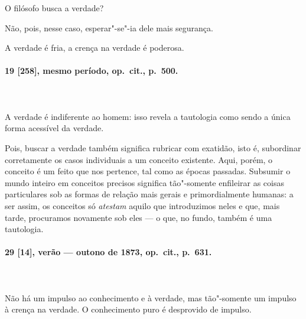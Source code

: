 O filósofo busca a verdade?

Não, pois, nesse caso, esperar"-se"-ia dele mais segurança.

A verdade é fria, a crença na verdade é poderosa.

\pagebreak
\paragraph*{19 [258], mesmo período, op.~cit., p.~500.}
\ \\
\ \\

A verdade é indiferente ao homem: isso revela a tautologia como sendo a
única forma acessível da verdade.

Pois, buscar a verdade também significa rubricar com exatidão, isto é,
subordinar corretamente os casos individuais a um conceito existente.
Aqui, porém, o conceito é um feito que nos pertence, tal como as épocas
passadas. Subsumir o mundo inteiro em conceitos precisos significa
tão"-somente enfileirar as coisas particulares sob as formas de relação
mais gerais e primordialmente humanas: a ser assim, os conceitos só
\textit{atestam} aquilo que introduzimos neles e que, mais tarde,
procuramos novamente sob eles --- o que, no fundo, também é uma
tautologia.

\pagebreak
\paragraph*{29 [14], verão --- outono de 1873, op.~cit., p.~631.}
\ \\
\ \\
Não há um impulso ao conhecimento e à verdade, mas tão"-somente um
impulso à crença na verdade. O conhecimento puro é desprovido de
impulso.
